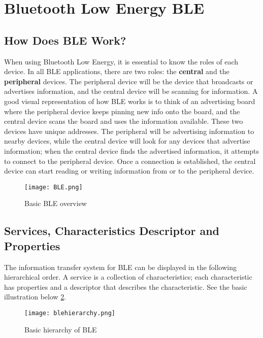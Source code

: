 \section{Bluetooth Low Energy BLE}
\label{sec:ble}

\subsection{How Does BLE Work?}
\label{sec:howdoesblework}

When using Bluetooth Low Energy, it is essential to know the roles of each device. In all BLE applications, there are two roles: the \textbf{central} and the \textbf{peripheral} devices. \cite{josebagur2022} The peripheral device will be the device that broadcasts or advertises information, and the central device will be scanning for information. A good visual representation of how BLE works is to think of an advertising board where the peripheral device keeps pinning new info onto the board, and the central device scans the board and uses the information available. These two devices have unique addresses. The peripheral will be advertising information to nearby devices, while the central device will look for any devices that advertise information; when the central device finds the advertised information, it attempts to connect to the peripheral device. Once a connection is established, the central device can start reading or writing information from or to the peripheral device.

\begin{figure}[!h]
    \centering
    \texttt{[image: BLE.png]}
    \caption{Basic BLE overview}
    \label{fig:bleoverview}
\end{figure}



\subsection{Services, Characteristics Descriptor and Properties}
\label{sec:servicesandcharacteristics}
The information transfer system for BLE can be displayed in the following hierarchical order. A service is a collection of characteristics; each characteristic has properties and a descriptor that describes the characteristic. See the basic illustration below \ref{fig:ble_roles}.

\begin{figure}[!h]
    \centering
    \texttt{[image: blehierarchy.png]}
    \caption{Basic hierarchy of BLE}
    \label{fig:ble_roles}
\end{figure}

